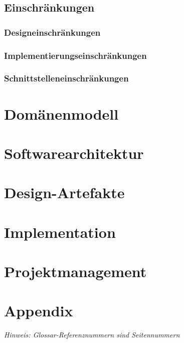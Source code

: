 \documentclass[11pt,ngerman]{article}
\begin{document}
    \subsection{Einschränkungen}

    \subsubsection{Designeinschränkungen}

    \subsubsection{Implementierungseinschränkungen}

    \subsubsection{Schnittstelleneinschränkungen}

    \section{Domänenmodell}

    \section{Softwarearchitektur}

    \section{Design-Artefakte}

    \section{Implementation}

    \section{Projektmanagement}


     \newpage

    \section{Appendix}
    \textit{Hinweis: Glossar-Referenznummern sind Seitennummern}
    \printglossary
\end{document}
